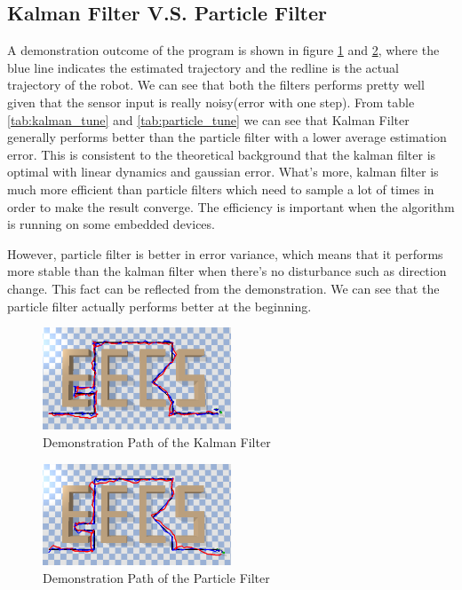 \documentclass[letterpaper,11pt]{article}
\begin{document}
\subsection{Kalman Filter V.S. Particle Filter}
A demonstration outcome of the program is shown in figure \ref{fig:demo_kalman} and \ref{fig:demo_particle}, where the blue line indicates the estimated trajectory and the redline is the actual trajectory of the robot. We can see that both the filters performs pretty well given that the sensor input is really noisy(error with one step). From table \ref{tab:kalman_tune} and \ref{tab:particle_tune} we can see that Kalman Filter generally performs better than the particle filter with a lower average estimation error. This is consistent to the theoretical background that the kalman filter is optimal with linear dynamics and gaussian error. What's more, kalman filter is much more efficient than particle filters which need to sample a lot of times in order to make the result converge. The efficiency is important when the algorithm is running on some embedded devices.

However, particle filter is better in error variance, which means that it performs more stable than the kalman filter when there's no disturbance such as direction change. This fact can be reflected from the demonstration. We can see that the particle filter actually performs better at the beginning.
\begin{figure}[ht]
	\centering
	\includegraphics[width=0.5\textwidth]{./demo_kalman.png}
	\caption{Demonstration Path of the Kalman Filter}
	\label{fig:demo_kalman}
\end{figure}
\begin{figure}[ht] 
	\centering
	\includegraphics[width=0.5\textwidth]{./demo_particle.png}
	\caption{Demonstration Path of the Particle Filter}
	\label{fig:demo_particle}
\end{figure}
\end{document}
